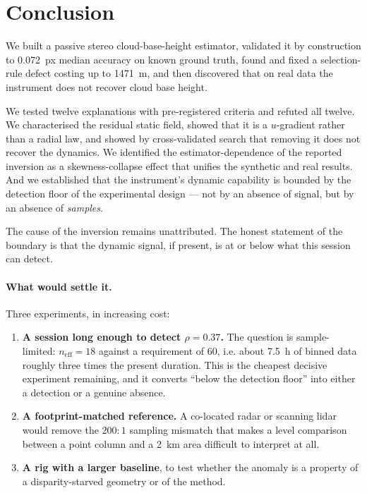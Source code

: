 \documentclass[11pt,a4paper]{article}
\newcommand{\neff}{\ensuremath{n_{\mathrm{eff}}}}
\newcommand{\rhoS}{\ensuremath{\rho}}
\begin{document}
\section{Conclusion}
\label{sec:conclusion}

We built a passive stereo cloud-base-height estimator, validated it by construction to
\SI{0.072}{px} median accuracy on known ground truth, found and fixed a selection-rule defect
costing up to \SI{1471}{\metre}, and then discovered that on real data the instrument does not
recover cloud base height.

We tested twelve explanations with pre-registered criteria and refuted all twelve. We
characterised the residual static field, showed that it is a $u$-gradient rather than a radial
law, and showed by cross-validated search that removing it does not recover the dynamics. We
identified the estimator-dependence of the reported inversion as a skewness-collapse effect
that unifies the synthetic and real results. And we established that the instrument's dynamic
capability is bounded by the detection floor of the experimental design --- not by an absence
of signal, but by an absence of \emph{samples}.

The cause of the inversion remains unattributed. The honest statement of the boundary is that
the dynamic signal, if present, is at or below what this session can detect.

\paragraph{What would settle it.} Three experiments, in increasing cost:

\begin{enumerate}
\item \textbf{A session long enough to detect $\rhoS = 0.37$.} The question is sample-limited:
$\neff = 18$ against a requirement of $60$, i.e. about \SI{7.5}{\hour} of binned data roughly
three times the present duration. This is the cheapest decisive experiment remaining, and it
converts ``below the detection floor'' into either a detection or a genuine absence.
\item \textbf{A footprint-matched reference.} A co-located radar or scanning lidar would remove
the $200{:}1$ sampling mismatch that makes a level comparison between a point column and a
\SI{2}{\km} area difficult to interpret at all.
\item \textbf{A rig with a larger baseline}, to test whether the anomaly is a property of a
disparity-starved geometry or of the method.
\end{enumerate}
\end{document}

